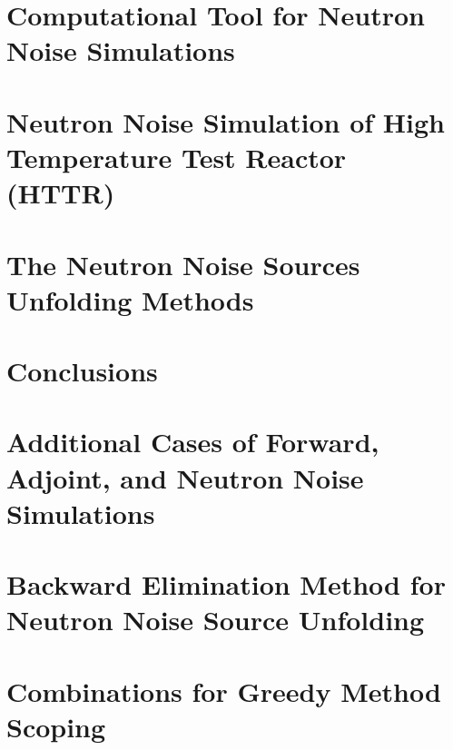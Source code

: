 \documentclass{uiucthesis2021}
\newcounter{counterforappendices}
\begin{document}
\chapter{Computational Tool for Neutron Noise Simulations}


\chapter{Neutron Noise Simulation of High Temperature Test Reactor (HTTR)}


\chapter{The Neutron Noise Sources Unfolding Methods}


\chapter{Conclusions}


\backmatter

\printbibliography[heading=bibintoc,title={References}]

\clearpage
\setcounter{counterforappendices}{\value{page}}
\mainmatter
\setcounter{page}{\value{counterforappendices}}

\appendix

\chapter{Additional Cases of Forward, Adjoint, and Neutron Noise Simulations}


\chapter{Backward Elimination Method for Neutron Noise Source Unfolding}


\chapter{Combinations for Greedy Method Scoping}

\end{document}
